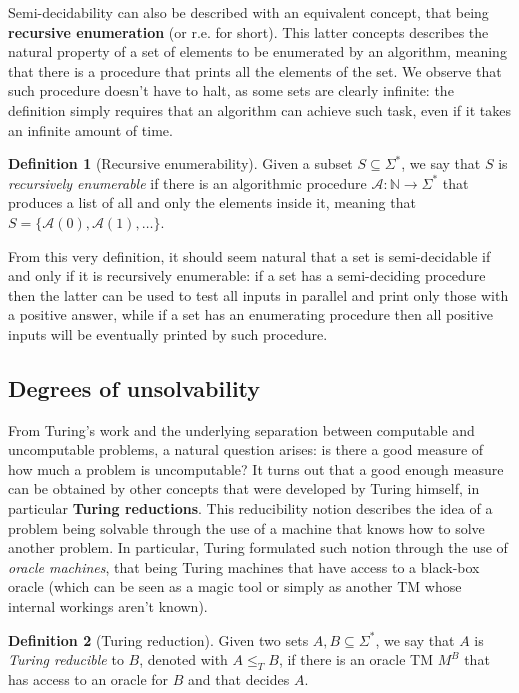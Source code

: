 \documentclass[12pt,a4paper]{article}
\theoremstyle{definition}
\newtheorem{definition}{Definition}
\newcommand{\N}{\mathbb{N}}                     %
\begin{document}
    Semi-decidability can also be described with an equivalent concept, that being \textbf{recursive enumeration} (or r.e. for short). This latter concepts describes the natural property of a set of elements to be enumerated by an algorithm, meaning that there is a procedure that prints all the elements of the set. We observe that such procedure doesn't have to halt, as some sets are clearly infinite: the definition simply requires that an algorithm can achieve such task, even if it takes an infinite amount of time. 

    \begin{definition}[Recursive enumerability]
        Given a subset $S \subseteq \Sigma^*$, we say that $S$ is \textit{recursively enumerable} if there is an algorithmic procedure $\mathcal{A} : \N \to \Sigma^*$ that produces a list of all and only the elements inside it, meaning that $S = \{\mathcal{A}(0), \mathcal{A}(1), \ldots\}$.
    \end{definition}

    From this very definition, it should seem natural that a set is semi-decidable if and only if it is recursively enumerable: if a set has a semi-deciding procedure then the latter can be used to test all inputs in parallel and print only those with a positive answer, while if a set has an enumerating procedure then all positive inputs will be eventually printed by such procedure. 

    \subsection{Degrees of unsolvability}

    From Turing's work and the underlying separation between computable and uncomputable problems, a natural question arises: is there a good measure of how much a problem is uncomputable? It turns out that a good enough measure can be obtained by other concepts that were developed by Turing himself, in particular \textbf{Turing reductions}. This reducibility notion describes the idea of a problem being solvable through the use of a machine that knows how to solve another problem. In particular, Turing formulated such notion through the use of \textit{oracle machines}, that being Turing machines that have access to a black-box oracle (which can be seen as a magic tool or simply as another TM whose internal workings aren't known).

    \begin{definition}[Turing reduction]
        Given two sets $A, B \subseteq \Sigma^*$, we say that $A$ is \textit{Turing reducible} to $B$, denoted with $A \leq_T B$, if there is an oracle TM $M^B$ that has access to an oracle for $B$ and that decides $A$.
    \end{definition}
    
\end{document}
